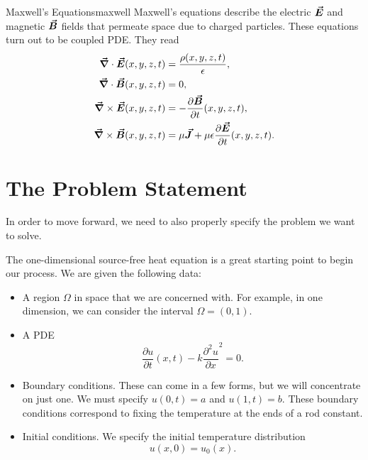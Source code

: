         \begin{ex}{Maxwell's Equations}{maxwell}
        Maxwell's equations describe the electric $\boldsymbol{\vec{E}}$ and magnetic $\boldsymbol{\vec{B}}$ fields that permeate space due to charged particles.  These equations turn out to be coupled PDE.  They read
        \begin{align*}
            \boldsymbol{\vec{\nabla}} \cdot \boldsymbol{\vec{E}}(x,y,z,t) &= \frac{\rho(x,y,z,t)}{\epsilon},\\
            \boldsymbol{\vec{\nabla}} \cdot \boldsymbol{\vec{B}}(x,y,z,t) &= 0,\\
            \boldsymbol{\vec{\nabla}} \times \boldsymbol{\vec{E}}(x,y,z,t) &= -\frac{\partial \boldsymbol{\vec{B}}}{\partial t}(x,y,z,t),\\
            \boldsymbol{\vec{\nabla}} \times \boldsymbol{\vec{B}}(x,y,z,t) &= \mu \boldsymbol{\vec{J}} + \mu \epsilon \frac{\partial \boldsymbol{\vec{E}}}{\partial t}(x,y,z,t).
        \end{align*}
        \end{ex}
        
        \section{The Problem Statement}
        
        In order to move forward, we need to also properly specify the problem we want to solve.
        
        The one-dimensional source-free heat equation is a great starting point to begin our process.  We are given the following data:
        \begin{itemize}
            \item A region $\Omega$ in space that we are concerned with.  For example, in one dimension, we can consider the interval $\Omega=(0,1)$.
            \item A PDE
            \[
            \frac{\partial u}{\partial t}(x,t) -k \frac{\partial^2 u}{\partial x}^2 = 0.
            \]
            \item Boundary conditions. These can come in a few forms, but we will concentrate on just one. We must specify $u(0,t)=a$ and $u(1,t)=b$.  These boundary conditions correspond to fixing the temperature at the ends of a rod constant.
            \item Initial conditions. We specify the initial temperature distribution
            \[
            u(x,0)=u_0(x).
            \]
        \end{itemize}
    
    

